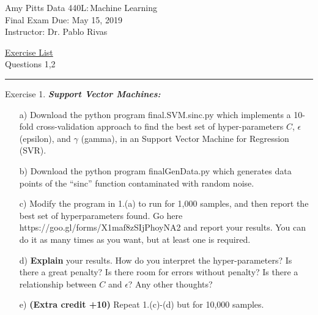 \documentclass[12pt]{article}
\newcommand{\myname}{Amy Pitts} %
\newcommand{\duedate}{May 15, 2019} %
\newcommand{\courseno}{440L}      %
\newcommand{\coursename}{Machine Learning}    %
\newcommand{\instructorname}{Instructor: Dr. Pablo Rivas} %
\newcommand{\assignumber}{}   %
\newcommand{\exerciselist}{Questions 1,2}      %
\newcommand{\firstpageinfo}  
    {\textsf{\large\myname}    \hfill     Data \courseno{:}\,\coursename \\
    Final Exam \assignumber \hfill  Due:  \duedate \\
  \instructorname}
\newenvironment{exercise}[1][]{%
  \bigskip                          %
  \noindent \textsf{Exercise #1.}\slshape }{}
\begin{document}
\thispagestyle{empty}

\noindent\firstpageinfo
\begin{center} \underline{\textsf{Exercise List}}\\[5pt] \exerciselist \end{center}
\medskip\hrule


\begin{exercise}[1] %
  \textbf{Support Vector Machines:}
  \begin{enumerate}
    \item[a)] Download the python program final.SVM.sinc.py which implements 
    a 10-fold cross-validation approach to find the best set of 
    hyper-parameters $C$, $\epsilon$ (epsilon), and $\gamma$ (gamma), 
    in an Support Vector Machine for Regression (SVR).
    \item[b)] Download the python program finalGenData.py 
    which generates data points of the “sinc” function 
    contaminated with random noise.
    \item[c)]  Modify the program in 1.(a) to run for 1,000 samples, 
    and then report the best set of hyperparameters found. 
    Go here https://goo.gl/forms/X1maf8zSIjPhoyNA2 and report 
    your results. You can do it as many times as you want, 
    but at least one is required.
    \item[d)] \textbf{Explain} your results. How do you interpret the 
    hyper-parameters? Is there a great penalty?
    Is there room for errors without penalty? Is there a 
    relationship between $C$ and $\epsilon$? Any other
    thoughts?
    \item[e)] \textbf{(Extra credit +10)} Repeat 1.(c)-(d) but for 10,000 samples.
  \end{enumerate}
\end{exercise}
  
\end{document}
